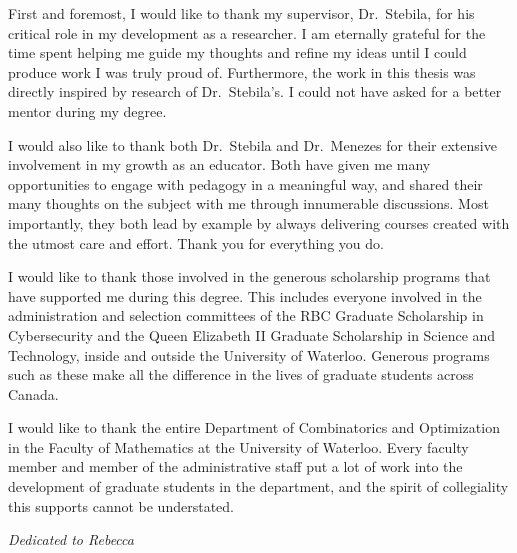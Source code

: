 First and foremost, I would like to thank my supervisor, Dr.\ Stebila, for his critical role in my development as a researcher. I am eternally grateful for the time spent helping me guide my thoughts and refine my ideas until I could produce work I was truly proud of. Furthermore, the work in this thesis was directly inspired by research of Dr.\ Stebila's. I could not have asked for a better mentor during my degree.

I would also like to thank both Dr.\ Stebila and Dr.\ Menezes for their extensive involvement in my growth as an educator. Both have given me many opportunities to engage with pedagogy in a meaningful way, and shared their many thoughts on the subject with me through innumerable discussions. Most importantly, they both lead by example by always delivering courses created with the utmost care and effort. Thank you for everything you do.

I would like to thank those involved in the generous scholarship programs that have supported me during this degree. This includes everyone involved in the administration and selection committees of the RBC Graduate Scholarship in Cybersecurity and the Queen Elizabeth II Graduate Scholarship in Science and Technology, inside and outside the University of Waterloo. Generous programs such as these make all the difference in the lives of graduate students across Canada.

I would like to thank the entire Department of Combinatorics and Optimization in the Faculty of Mathematics at the University of Waterloo. Every faculty member and member of the administrative staff put a lot of work into the development of graduate students in the department, and the spirit of collegiality this supports cannot be understated.
\cleardoublepage


\vspace*{2.5cm}

\begin{center}\textit{Dedicated to Rebecca}\end{center}
\cleardoublepage

\renewcommand\contentsname{Table of Contents}
\tableofcontents
\cleardoublepage
{}    %

\listoffigures
\cleardoublepage
{}		%

\listoftables
\cleardoublepage
{}		%


